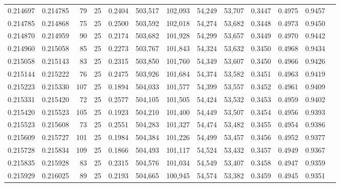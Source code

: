 \begin{tabular}{rrrrrrrrrrrrr}
0.214697 & 0.214785 &    79 &  25 &                                     0.2404 & 503,517 & 102,093 &  54,249 &  53,707 & 0.3447 & 0.4975 & 0.9457 \\
0.214785 & 0.214868 &    75 &  25 &                                     0.2500 & 503,592 & 102,018 &  54,274 &  53,682 & 0.3448 & 0.4973 & 0.9450 \\
0.214870 & 0.214959 &    90 &  25 &                                     0.2174 & 503,682 & 101,928 &  54,299 &  53,657 & 0.3449 & 0.4970 & 0.9442 \\
0.214960 & 0.215058 &    85 &  25 &                                     0.2273 & 503,767 & 101,843 &  54,324 &  53,632 & 0.3450 & 0.4968 & 0.9434 \\
0.215058 & 0.215143 &    83 &  25 &                                     0.2315 & 503,850 & 101,760 &  54,349 &  53,607 & 0.3450 & 0.4966 & 0.9426 \\
0.215144 & 0.215222 &    76 &  25 &                                     0.2475 & 503,926 & 101,684 &  54,374 &  53,582 & 0.3451 & 0.4963 & 0.9419 \\
0.215223 & 0.215330 &   107 &  25 &                                     0.1894 & 504,033 & 101,577 &  54,399 &  53,557 & 0.3452 & 0.4961 & 0.9409 \\
0.215331 & 0.215420 &    72 &  25 &                                     0.2577 & 504,105 & 101,505 &  54,424 &  53,532 & 0.3453 & 0.4959 & 0.9402 \\
0.215420 & 0.215523 &   105 &  25 &                                     0.1923 & 504,210 & 101,400 &  54,449 &  53,507 & 0.3454 & 0.4956 & 0.9393 \\
0.215523 & 0.215608 &    73 &  25 &                                     0.2551 & 504,283 & 101,327 &  54,474 &  53,482 & 0.3455 & 0.4954 & 0.9386 \\
0.215609 & 0.215727 &   101 &  25 &                                     0.1984 & 504,384 & 101,226 &  54,499 &  53,457 & 0.3456 & 0.4952 & 0.9377 \\
0.215728 & 0.215834 &   109 &  25 &                                     0.1866 & 504,493 & 101,117 &  54,524 &  53,432 & 0.3457 & 0.4949 & 0.9367 \\
0.215835 & 0.215928 &    83 &  25 &                                     0.2315 & 504,576 & 101,034 &  54,549 &  53,407 & 0.3458 & 0.4947 & 0.9359 \\
0.215929 & 0.216025 &    89 &  25 &                                     0.2193 & 504,665 & 100,945 &  54,574 &  53,382 & 0.3459 & 0.4945 & 0.9351 \\

\end{tabular}
